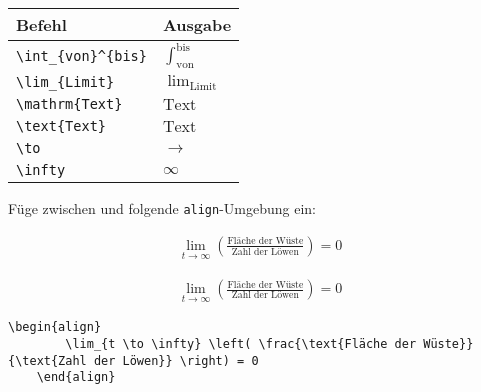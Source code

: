 \begin{frame}[fragile]
	\begin{center}
		\begin{tabular}{ll}
			\toprule
			Befehl							&	Ausgabe					\\ \midrule
			\lstinline|\int_{von}^{bis}|		&	$\int_{\text{von}}^{\text{bis}}$		\\ \addlinespace[0.5em]
			\lstinline|\lim_{Limit}|		&	$\lim_{\text{Limit}}$		\\
			\lstinline|\mathrm{Text}|		&	$\mathrm{Text}$		
      \\
			\lstinline|\text{Text}|		&	$\text{Text}$		
			\\
			\lstinline|\to|					&	$\to$		\\
			\lstinline|\infty|					&	$\infty$		\\
			\bottomrule
		\end{tabular}
	\end{center}
	\pause\btVFill
	\Aufgabee
		Füge zwischen  und  folgende \lstinline[basicstyle=\normalfont\normalsize]|align|-Umgebung ein:
	\begin{outputbox}
	    \begin{align}
		    \lim_{t \to \infty} \left( \frac{\text{Fläche der Wüste}}{\text{Zahl der Löwen}} \right) = 0
	    \end{align}	
    \end{outputbox}
	\vspace{0.3cm}
\end{frame}
\begin{frame}[fragile]
	\Losung
	\begin{outputbox}
	    \begin{align}
	      \lim_{t \to \infty} \left( \frac{\text{Fläche der Wüste}}{\text{Zahl der Löwen}} \right) = 0
	    \end{align}
	\end{outputbox}

	\Code
	\begin{lstlisting}[gobble=4]
    \begin{align}
        \lim_{t \to \infty} \left( \frac{\text{Fläche der Wüste}}{\text{Zahl der Löwen}} \right) = 0
    \end{align}
	\end{lstlisting}
\end{frame}
